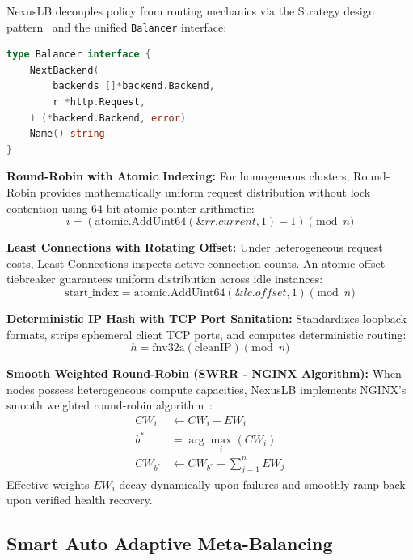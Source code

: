 \documentclass[12pt,openany]{report}
\begin{document}
NexusLB decouples policy from routing mechanics via the Strategy design pattern~\cite{gamma1994} and the unified \texttt{Balancer} interface:
\begin{lstlisting}[language=Go, basicstyle=\ttfamily\footnotesize, frame=single, breaklines=true]
type Balancer interface {
    NextBackend(
        backends []*backend.Backend,
        r *http.Request,
    ) (*backend.Backend, error)
    Name() string
}
\end{lstlisting}

\textbf{Round-Robin with Atomic Indexing:} For homogeneous clusters, Round-Robin provides mathematically uniform request distribution without lock contention using 64-bit atomic pointer arithmetic:
\begin{equation}
i = (\text{atomic.AddUint64}(\&rr.current, 1) - 1) \pmod n
\end{equation}

\textbf{Least Connections with Rotating Offset:} Under heterogeneous request costs, Least Connections inspects active connection counts. An atomic offset tiebreaker guarantees uniform distribution across idle instances:
\begin{equation}
\text{start\_index} = \text{atomic.AddUint64}(\&lc.offset, 1) \pmod n
\end{equation}

\textbf{Deterministic IP Hash with TCP Port Sanitation:} Standardizes loopback formats, strips ephemeral client TCP ports, and computes deterministic routing:
\begin{equation}
h = \text{fnv32a}(\text{cleanIP}) \pmod n
\end{equation}

\textbf{Smooth Weighted Round-Robin (SWRR - NGINX Algorithm):} When nodes possess heterogeneous compute capacities, NexusLB implements NGINX's smooth weighted round-robin algorithm~\cite{nginx_swrr}:
\begin{align}
CW_i &\leftarrow CW_i + EW_i \\
b^* &= \arg\max_{i} (CW_i) \\
CW_{b^*} &\leftarrow CW_{b^*} - \sum_{j=1}^{n} EW_j
\end{align}
Effective weights $EW_i$ decay dynamically upon failures and smoothly ramp back upon verified health recovery.

\subsection{Smart Auto Adaptive Meta-Balancing}
\end{document}
